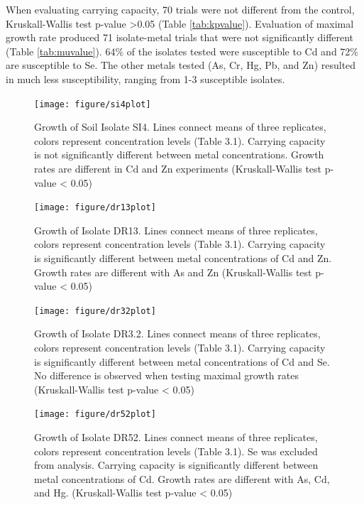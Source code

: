 \documentclass[ms, hidelinks]{uncgdissertationexp}
\theoremstyle{plain}
\theoremstyle{definition}
\theoremstyle{remark}
\begin{document}
When evaluating carrying capacity, 70 trials were not different from the control, Kruskall-Wallis test p-value \textgreater0.05 (Table \ref{tab:kpvalue}). Evaluation of maximal growth rate produced 71 isolate-metal trials that were not significantly different (Table \ref{tab:muvalue}). 64\% of the isolates tested were susceptible to Cd and 72\% are susceptible to Se. The other metals tested (As, Cr, Hg, Pb, and Zn) resulted in much less susceptibility, ranging from 1-3 susceptible isolates.
\begin{figure}
   \centering
   \texttt{[image: figure/si4plot]}
   \caption[Growth of Soil Isolate SI4.]{Growth of Soil Isolate SI4. Lines connect means of three replicates, colors represent concentration levels (Table 3.1). Carrying capacity is not significantly different between metal concentrations. Growth rates are different in Cd and Zn experiments (Kruskall-Wallis test p-value < 0.05)}\label{fig:si4}
\end{figure}
\begin{figure}
    \centering
    \texttt{[image: figure/dr13plot]}
    \caption[Growth of Isolate DR13.]{Growth of Isolate DR13. Lines connect means of three replicates, colors represent concentration levels (Table 3.1). Carrying capacity is significantly different between metal concentrations of Cd and Zn.  Growth rates are different with As and Zn (Kruskall-Wallis test p-value < 0.05)}\label{fig:dr13}
\end{figure}
\begin{figure}
  
  \centering
    \texttt{[image: figure/dr32plot]}
    \caption[Growth of Isolate DR3.2.]{Growth of Isolate DR3.2. Lines connect means of three replicates, colors represent concentration levels (Table 3.1). Carrying capacity is significantly different between metal concentrations of Cd and Se. No difference is observed when testing maximal growth rates (Kruskall-Wallis test p-value < 0.05)}\label{fig:dr32}
\end{figure}
\begin{figure}
  
  \centering
    \texttt{[image: figure/dr52plot]}
    \caption[Growth of Isolate DR52.]{Growth of Isolate DR52. Lines connect means of three replicates, colors represent concentration levels (Table 3.1). Se was excluded from analysis. Carrying capacity is significantly different between metal concentrations of Cd. Growth rates are different with As, Cd, and Hg. (Kruskall-Wallis test p-value < 0.05) }\label{fig:dr52}
\end{figure}
\end{document}
